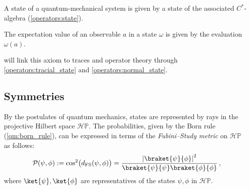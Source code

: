     \begin{axiom}[States]
        A state of a quantum-mechanical system is given by a state of the associated $C^*$-algebra (\cref{operators:state}).
    \end{axiom}

    \begin{axiom}
        The expectation value of an observable $a$ in a state $\omega$ is given by the evaluation $\omega(a)$.
    \end{axiom}
    \begin{remark}
         will link this axiom to traces and operator theory through \cref{operators:tracial_state} and \cref{operators:normal_state}.
    \end{remark}

    \begin{axiom}[Projection]
        
    \end{axiom}

    \begin{axiom}

    \end{axiom}


\subsection{Symmetries}

    \begin{property}[States]
        By the postulates of quantum mechanics, states are represented by rays in the projective Hilbert space $\mathcal{H}\mathbb{P}$. The probabilities, given by the Born rule (\cref{qm:born_rule}), can be expressed in terms of the \textit{Fubini--Study metric} on $\mathcal{H}\mathbb{P}$ as follows:
        \begin{gather}
            \mathcal{P}(\psi,\phi) := \cos^2\bigl(d_{\text{FS}}(\psi,\phi)\bigr) = \frac{\left|\braket{\psi}{\phi}\right|^2}{\braket{\psi}{\psi}\braket{\phi}{\phi}}\,,
        \end{gather}
        where $\ket{\psi},\ket{\phi}$ are representatives of the states $\psi,\phi$ in $\mathcal{H}\mathbb{P}$.
    \end{property}



